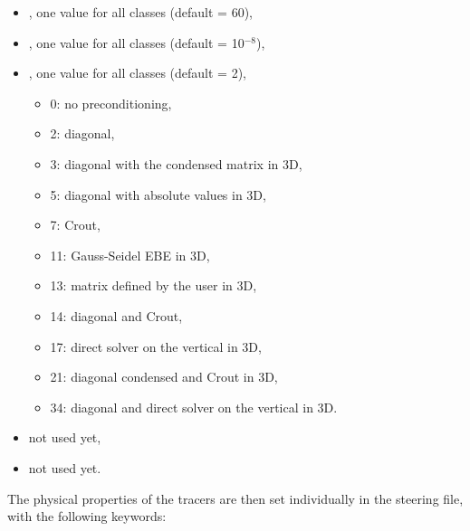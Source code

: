 \begin{itemize}
  \item {}, one value for all classes (default = 60),
  \item {}, one value for all classes (default = 10$^{-8}$),
  \item {}, one value for all classes (default = 2),
    \begin{itemize}
      \item 0: no preconditioning,
      \item 2: diagonal,
      \item 3: diagonal with the condensed matrix in 3D,
      \item 5: diagonal with absolute values in 3D,
      \item 7: Crout,
      \item 11: Gauss-Seidel EBE in 3D,
      \item 13: matrix defined by the user in 3D,
      \item 14: diagonal and Crout,
      \item 17: direct solver on the vertical in 3D,
      \item 21: diagonal condensed and Crout in 3D,
      \item 34: diagonal and direct solver on the vertical in 3D.
    \end{itemize}
  \item {} not used yet, %
  \item {} not used yet. %
\end{itemize}

The physical properties of the tracers are then set individually in the \khione steering file, with the following keywords:

